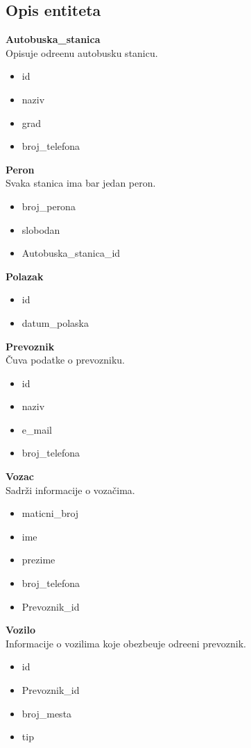 \subsection{Opis entiteta}

\textbf{Autobuska\_stanica} \\
Opisuje odre\dj{}enu autobusku stanicu.
\begin{itemize}
	\item id
	\item naziv
	\item grad
	\item broj\_telefona
\end{itemize}
\textbf{Peron} \\
Svaka stanica ima bar jedan peron.
\begin{itemize}
	\item broj\_perona
	\item slobodan
	\item Autobuska\_stanica\_id 
\end{itemize}
\textbf{Polazak} \\
\begin{itemize}
	\item id
	\item datum\_polaska
\end{itemize}
\textbf{Prevoznik} \\
\v Cuva podatke o prevozniku.
\begin{itemize}
	\item id
	\item naziv
	\item e\_mail
	\item broj\_telefona
\end{itemize}
\textbf{Vozac} \\
Sadr\v zi informacije o voza\v cima.
\begin{itemize}
	\item maticni\_broj
	\item ime
	\item prezime
	\item broj\_telefona
	\item Prevoznik\_id
\end{itemize}
\textbf{Vozilo} \\
Informacije o vozilima koje obezbe\dj{}uje odre\dj{}eni prevoznik.
\begin{itemize}
	\item id
	\item Prevoznik\_id
	\item broj\_mesta
	\item tip
\end{itemize}
